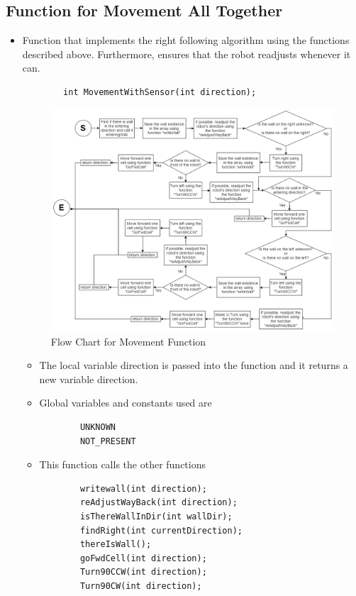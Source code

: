\documentclass[11pt]{article}
\begin{document}
\subsection{Function for Movement All Together}
\begin{itemize}
\item Function that implements the right following algorithm using the functions described above. Furthermore, ensures that the robot readjusts whenever it can.
	\begin{verbatim}
		int MovementWithSensor(int direction);
	\end{verbatim}
\begin{figure}[htp]
\centering
\includegraphics[scale=0.45]{images/Software_Flowchart/MovementWithSensor.png}
\caption{Flow Chart for Movement Function}
\label{}
\end{figure}
	\begin{itemize}
	\item The local variable direction is passed into the function and it returns a new variable direction.
	\item Global variables and constants used are
	\begin{verbatim}
		UNKNOWN
		NOT_PRESENT
	\end{verbatim}
	\item This function calls the other functions
	\begin{verbatim}
		writewall(int direction);
		reAdjustWayBack(int direction);
		isThereWallInDir(int wallDir);
		findRight(int currentDirection);
		thereIsWall();
		goFwdCell(int direction);
		Turn90CCW(int direction);
		Turn90CW(int direction);
	\end{verbatim}
	\end{itemize}
\end{itemize}
\newpage
\end{document}
